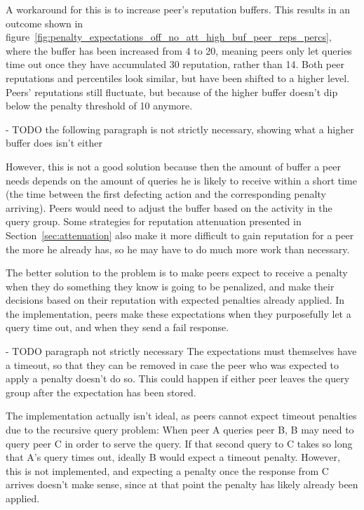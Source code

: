 A workaround for this is to increase peer's reputation buffers. This results in
an outcome shown in
figure~\ref{fig:penalty_expectations_off_no_att_high_buf_peer_reps_percs}, where
the buffer has been increased from 4 to 20, meaning peers only let queries time
out once they have accumulated 30 reputation, rather than 14. Both peer
reputations and percentiles look similar, but have been shifted to a higher
level. Peers' reputations still fluctuate, but because of the higher buffer
doesn't dip below the penalty threshold of 10 anymore.

- TODO the following paragraph is not strictly necessary, showing what a higher
  buffer does isn't either

However, this is not a good solution because then the amount of buffer a peer
needs depends on the amount of queries he is likely to receive within a short
time (the time between the first defecting action and the corresponding penalty
arriving). Peers would need to adjust the buffer based on the activity in the
query group. Some strategies for reputation attenuation presented in
Section~\ref{sec:attenuation} also make it more difficult to gain reputation for
a peer the more he already has, so he may have to do much more work than
necessary.

The better solution to the problem is to make peers expect to receive a penalty
when they do something they know is going to be penalized, and make their
decisions based on their reputation with expected penalties already applied. In
the implementation, peers make these expectations when they purposefully let a
query time out, and when they send a fail response.

- TODO paragraph not strictly necessary
The expectations must themselves have a timeout, so that they can be removed in
case the peer who was expected to apply a penalty doesn't do so. This could
happen if either peer leaves the query group after the expectation has been
stored.

The implementation actually isn't ideal, as peers cannot expect timeout
penalties due to the recursive query problem: When peer A queries peer B, B may
need to query peer C in order to serve the query. If that second query to C
takes so long that A's query times out, ideally B would expect a timeout
penalty. However, this is not implemented, and expecting a penalty once the
response from C arrives doesn't make sense, since at that point the penalty has
likely already been applied.

